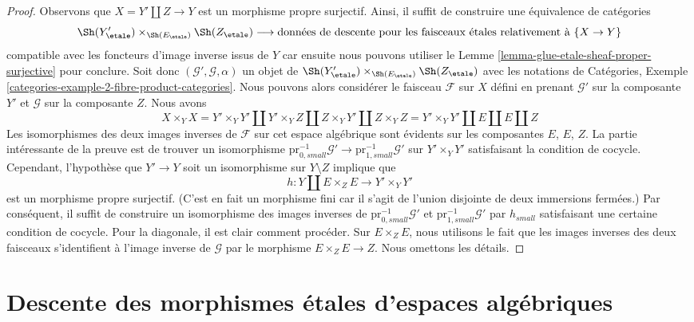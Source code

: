 \begin{proof}
Observons que $X = Y' \coprod Z \to Y$ est un morphisme propre surjectif.
Ainsi, il suffit de construire une équivalence de catégories
$$
\Sh(Y'_\etale) \times_{\Sh(E_\etale)} \Sh(Z_\etale)
\longrightarrow
\text{données de descente pour les faisceaux \'etales relativement à }\{X \to Y\}
$$
compatible avec les foncteurs d'image inverse issus de $Y$
car ensuite nous pouvons utiliser le Lemme \ref{lemma-glue-etale-sheaf-proper-surjective}
pour conclure. Soit donc $(\mathcal{G}', \mathcal{G}, \alpha)$ un
objet de $\Sh(Y'_\etale) \times_{\Sh(E_\etale)} \Sh(Z_\etale)$ avec
les notations de Catégories, Exemple
\ref{categories-example-2-fibre-product-categories}.
Nous pouvons alors considérer le faisceau $\mathcal{F}$ sur $X$ défini
en prenant $\mathcal{G}'$ sur la composante $Y'$ et $\mathcal{G}$
sur la composante $Z$. Nous avons
$$
X \times_Y X = Y' \times_Y Y' \amalg
Y' \times_Y Z \amalg Z \times_Y Y' \amalg Z \times_Y Z =
Y' \times_Y Y' \amalg E \amalg E \amalg Z
$$
Les isomorphismes des deux images inverses de $\mathcal{F}$ sur cet espace algébrique sont évidents sur les composantes $E$, $E$, $Z$. La partie intéressante de la preuve est de trouver un isomorphisme
$\text{pr}_{0, small}^{-1}\mathcal{G}' \to
\text{pr}_{1, small}^{-1}\mathcal{G}'$
sur $Y' \times_Y Y'$ satisfaisant la condition de cocycle. Cependant, l'hypothèse que $Y' \to Y$ soit un isomorphisme sur $Y \setminus Z$ implique que $$
h : Y \coprod E \times_Z E \longrightarrow Y' \times_Y Y'
$$ est un morphisme propre surjectif. (C'est en fait un morphisme fini car il s'agit de l'union disjointe de deux immersions fermées.) Par conséquent, il suffit de construire un isomorphisme des images inverses de $\text{pr}_{0, small}^{-1}\mathcal{G}'$ et $\text{pr}_{1, small}^{-1}\mathcal{G}'$ par $h_{small}$ satisfaisant une certaine condition de cocycle. Pour la diagonale, il est clair comment procéder. Sur $E \times_Z E$, nous utilisons le fait que les images inverses des deux faisceaux s'identifient à l'image inverse de $\mathcal{G}$ par le morphisme $E \times_Z E \to Z$. Nous omettons les détails. 
\end{proof}






\section{Descente des morphismes \'etales d'espaces algébriques}
\label{section-descending-etale}

